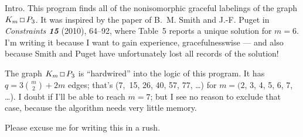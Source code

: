 
\datethis
\let\Xmod=\bmod %
\def\sqprod{\setbox0=\hbox{\kern-.13em$\times$\kern-.13em}
     \dimen0=\ht0 \advance\dimen0 -.09em \ht0=\dimen0
     \dimen0=\dp0 \advance\dimen0 -.09em \dp0=\dimen0
     \mathbin{\vcenter{\hrule\kern-.4pt
       \hbox{\vrule\kern-.4pt\phantom{$\box0$}\kern-.4pt\vrule}\kern-.4pt
       \hrule}}}


Intro. This program finds all of the nonisomorphic graceful labelings
of the graph $K_m\sqprod P_3$. It was inspired by the paper of
B.~M. Smith and J.-F. Puget in {\sl Constraints\/ \bf15} (2010), 64--92,
where Table~5 reports a unique solution for $m=6$. I'm writing it because
I want to gain experience, gracefulnesswise --- and also because Smith and
Puget
have unfortunately lost all records of the solution!

The graph $K_m\sqprod P_3$ is ``hardwired'' into the logic of this program.
It has $q=3{m\choose2}+2m$ edges; that's
(7,~15, 26, 40, 57, 77, \dots) for $m=(2$, 3, 4, 5, 6, 7, \dots).
I doubt if I'll be able to reach $m=7$; but I see no reason to exclude that
case, because the algorithm needs very little memory.

Please excuse me for writing this in a rush.


